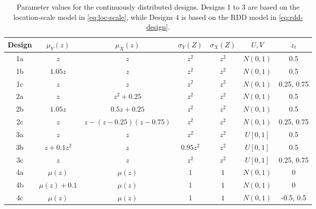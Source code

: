 \documentclass[11pt]{article}
\numberwithin{equation}{section}
\begin{document}
\begin{table}[h]\footnotesize
  \centering
  \begin{tabular}{ccccccc}\hline
      Design &$\mu_Y(z)$ &$\mu_X(z)$  & $\sigma_Y(Z)$ & $\sigma_X(Z)$  & $U,V$ & $z_{\ell}$  \\ \hline
       1a&  $z$&  $z$&   $z^2$& $z^2$ & $N(0,1)$ & 0.5\\
       1b&  $1.05z$&  $z$&  $z^2$&  $z^2$&  $N(0,1)$& 0.5\\
       1c&  $z$&  $z$&  $z^2$&  $z^2$& $N(0,1)$& 0.25, 0.75\\ \hline
       2a&  $z$ & \footnotesize{$z^2+0.25$}&   $z^2$&  $z^2$&  $N(0,1)$&  0.5\\
       2b&  $1.05z$ & \footnotesize{$0.5z + 0.25$} &   $z^2$&  $z^2$&  $N(0,1)$&  0.5\\
       2c&  $z$ & \footnotesize{$z-(z-0.25)(z-0.75)$} &   $z^2$&  $z^2$&  $N(0,1)$& 0.25, 0.75\\ \hline
       3a&  $z$&  $z$&   $z^2$&   $z^2$&  $U[0,1]$&  0.5\\
       3b&  $z+0.1z^2$& $z$&     $0.95z^2$& $z^2$&     $U[0,1]$&  0.5\\
       3c&  $z$&  $z$&   $z^2$&   $z^2$&  $U[0,1]$& 0.25, 0.75\\ \hline
       4a&  $\mu(z)$ & $\mu(z)$&  $1$ &  $1$&  $N(0,1)$&  0\\
       4b&  $\mu(z)+0.1$ & $\mu(z)$&  $1$ &  $1$& $N(0,1)$ & 0 \\
       4c&  $\mu(z)$ & $\mu(z)$&  $1$ &  $1$ &  $N(0,1)$& -0.5, 0.5\\ \hline 
  \end{tabular}
  \caption{\footnotesize Parameter values for the continuously distributed designs. Designs 1 to 3 are based on the location-scale model in \eqref{eq:loc-scale}, while Designs 4 is based on the RDD model in \eqref{eq:rdd-design}.}
  \label{tab:Simu-Designs-14}
\end{table}
\end{document}
